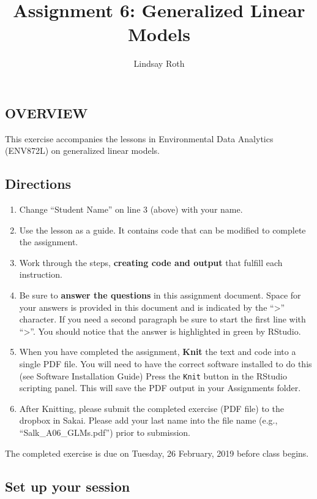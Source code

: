 \documentclass[]{article}
\title{Assignment 6: Generalized Linear Models}
\author{Lindsay Roth}
\date{}
\providecommand{\tightlist}{%
  \setlength{\itemsep}{0pt}\setlength{\parskip}{0pt}}
\begin{document}
\maketitle

\subsection{OVERVIEW}\label{overview}

This exercise accompanies the lessons in Environmental Data Analytics
(ENV872L) on generalized linear models.

\subsection{Directions}\label{directions}

\begin{enumerate}
\def\labelenumi{\arabic{enumi}.}
\tightlist
\item
  Change ``Student Name'' on line 3 (above) with your name.
\item
  Use the lesson as a guide. It contains code that can be modified to
  complete the assignment.
\item
  Work through the steps, \textbf{creating code and output} that fulfill
  each instruction.
\item
  Be sure to \textbf{answer the questions} in this assignment document.
  Space for your answers is provided in this document and is indicated
  by the ``\textgreater{}'' character. If you need a second paragraph be
  sure to start the first line with ``\textgreater{}''. You should
  notice that the answer is highlighted in green by RStudio.
\item
  When you have completed the assignment, \textbf{Knit} the text and
  code into a single PDF file. You will need to have the correct
  software installed to do this (see Software Installation Guide) Press
  the \texttt{Knit} button in the RStudio scripting panel. This will
  save the PDF output in your Assignments folder.
\item
  After Knitting, please submit the completed exercise (PDF file) to the
  dropbox in Sakai. Please add your last name into the file name (e.g.,
  ``Salk\_A06\_GLMs.pdf'') prior to submission.
\end{enumerate}

The completed exercise is due on Tuesday, 26 February, 2019 before class
begins.

\subsection{Set up your session}\label{set-up-your-session}
\end{document}
